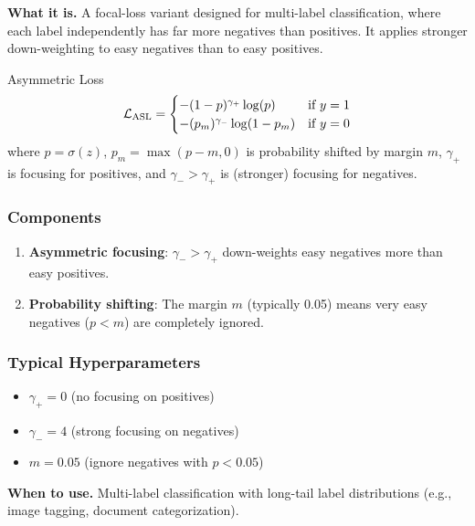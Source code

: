 \textbf{What it is.} A focal-loss variant designed for multi-label classification, where each label independently has far more negatives than positives. It applies stronger down-weighting to easy negatives than to easy positives.

\begin{mathresult}{Asymmetric Loss}
\begin{equation}
\mathcal{L}_{\text{ASL}} = \begin{cases}
-(1-p)^{\gamma_+} \log(p) & \text{if } y = 1 \\
-(p_m)^{\gamma_-} \log(1-p_m) & \text{if } y = 0
\end{cases}
\end{equation}
where $p = \sigma(z)$, $p_m = \max(p - m, 0)$ is probability shifted by margin $m$, $\gamma_+$ is focusing for positives, and $\gamma_- > \gamma_+$ is (stronger) focusing for negatives.
\end{mathresult}

\subsubsection{Components}

\begin{enumerate}
    \item \textbf{Asymmetric focusing}: $\gamma_- > \gamma_+$ down-weights easy negatives more than easy positives.

    \item \textbf{Probability shifting}: The margin $m$ (typically 0.05) means very easy negatives ($p < m$) are completely ignored.
\end{enumerate}

\subsubsection{Typical Hyperparameters}

\begin{itemize}
    \item $\gamma_+ = 0$ (no focusing on positives)
    \item $\gamma_- = 4$ (strong focusing on negatives)
    \item $m = 0.05$ (ignore negatives with $p < 0.05$)
\end{itemize}

\textbf{When to use.} Multi-label classification with long-tail label distributions (e.g., image tagging, document categorization).

